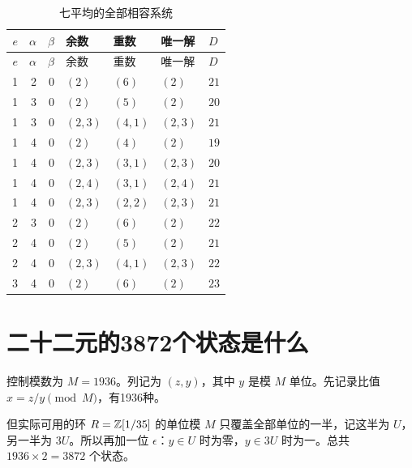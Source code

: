 \begingroup\small
\begin{longtable}{rrrllll}
\caption{七平均的全部相容系统}\label{tab:seven-data}\\
\toprule $e$&$\alpha$&$\beta$&余数&重数&唯一解&$D$\\\midrule\endfirsthead
\toprule $e$&$\alpha$&$\beta$&余数&重数&唯一解&$D$\\\midrule\endhead
1&2&0&$(2)$&$(6)$&$(2)$&$21$\\
1&3&0&$(2)$&$(5)$&$(2)$&$20$\\
1&3&0&$(2,3)$&$(4,1)$&$(2,3)$&$21$\\
1&4&0&$(2)$&$(4)$&$(2)$&$19$\\
1&4&0&$(2,3)$&$(3,1)$&$(2,3)$&$20$\\
1&4&0&$(2,4)$&$(3,1)$&$(2,4)$&$21$\\
1&4&0&$(2,3)$&$(2,2)$&$(2,3)$&$21$\\
2&3&0&$(2)$&$(6)$&$(2)$&$22$\\
2&4&0&$(2)$&$(5)$&$(2)$&$21$\\
2&4&0&$(2,3)$&$(4,1)$&$(2,3)$&$22$\\
3&4&0&$(2)$&$(6)$&$(2)$&$23$\\
\bottomrule\end{longtable}\endgroup

\section{二十二元的3872个状态是什么}
控制模数为 $M=1936$。列记为 $(z,y)$，其中 $y$ 是模 $M$ 单位。先记录比值 $x=z/y\pmod M$，有1936种。

但实际可用的环 $R=\mathbb Z[1/35]$ 的单位模 $M$ 只覆盖全部单位的一半，记这半为 $U$，另一半为 $3U$。所以再加一位 $\epsilon$：$y\in U$ 时为零，$y\in3U$ 时为一。总共 $1936\times2=3872$ 个状态。

